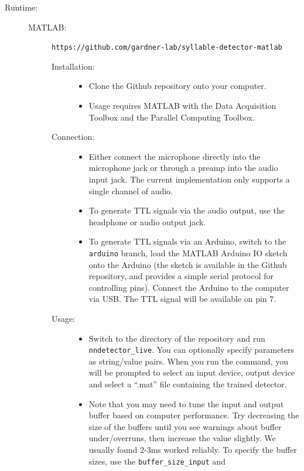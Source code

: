 \documentclass[10pt,letterpaper]{article}
\begin{document}
\begin{description}
\item[Runtime:]\hfill
  \begin{description}
  \item[MATLAB:] {\tt https://github.com/gardner-lab/syllable-detector-matlab}
    \begin{description}
    \item[Installation:]\hfill
      \begin{itemize}
      \item Clone the Github repository onto your computer.
      \item Usage requires MATLAB with the Data Acquisition Toolbox and the 
      Parallel Computing Toolbox.
      \end{itemize}
    \item[Connection:]\hfill
      \begin{itemize}
      \item Either connect the microphone directly into the microphone jack or through a 
      preamp into the audio input jack. The current implementation only supports a single 
      channel of audio.
      \item To generate TTL signals via the audio output, use the headphone or audio output
      jack.
      \item To generate TTL signals via an Arduino, switch to the {\tt arduino} branch, 
      load the MATLAB Arduino IO sketch onto the Arduino (the sketch is available in the 
      Github repository, and provides a simple serial protocol for controlling pins). 
      Connect the Arduino to the computer via USB. The TTL signal will be available on
      pin 7.
      \end{itemize}
    \item[Usage:]\hfill
      \begin{itemize}
      \item Switch to the directory of the repository and run {\tt nndetector\_live}. You
      can optionally specify parameters as string/value pairs. When you run the command,
      you will be prompted to select an input device, output device and select a ``.mat''
      file containing the trained detector.
      \item Note that you may need to tune the input and output buffer based on computer 
      performance. Try decreasing the size of the buffers until you see warnings about buffer
      under/overruns, then increase the value slightly. We usually found 2-3ms worked reliably.
      To specify the buffer sizes, use the {\tt buffer\_size\_input} and 

\end{itemize}
\end{description}
\end{description}
\end{description}
\end{document}
